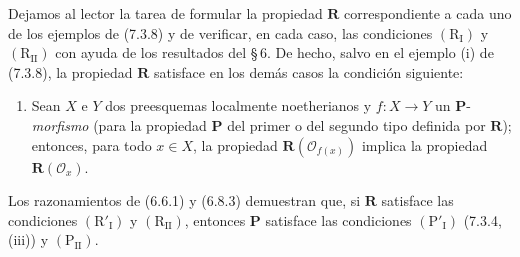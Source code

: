 \begin{remark}[7.3.11]
\label{IV.2.s7.3.11-fr}
Dejamos al lector la tarea de formular la propiedad $\boldsymbol R$
correspondiente a cada uno de los ejemplos de (7.3.8) y de verificar,
en cada caso, las condiciones $(\mathrm R_{\mathrm I})$ y
$(\mathrm R_{\mathrm{II}})$ con ayuda de los resultados del \S\,6.
De hecho, salvo en el ejemplo (i) de (7.3.8), la propiedad
$\boldsymbol R$ satisface en los demás casos la condición siguiente:
\begin{enumerate}
\item[$(\mathrm R'_{\mathrm I})$] Sean $X$ e $Y$ dos preesquemas
localmente noetherianos y $f:X\to Y$ un $\boldsymbol P$-\emph{morfismo}
(para la propiedad $\boldsymbol P$ del primer o del segundo tipo
definida por $\boldsymbol R$); entonces, para todo $x\in X$, la
propiedad $\boldsymbol R(\mathscr O_{f(x)})$ implica la propiedad
$\boldsymbol R(\mathscr O_x)$.
\end{enumerate}

Los razonamientos de (6.6.1) y (6.8.3) demuestran que, si
$\boldsymbol R$ satisface las condiciones $(\mathrm R'_{\mathrm I})$
y $(\mathrm R_{\mathrm{II}})$, entonces $\boldsymbol P$ satisface las
condiciones $(\mathrm P'_{\mathrm I})$ (7.3.4, (iii)) y
$(\mathrm P_{\mathrm{II}})$.
\end{remark}
